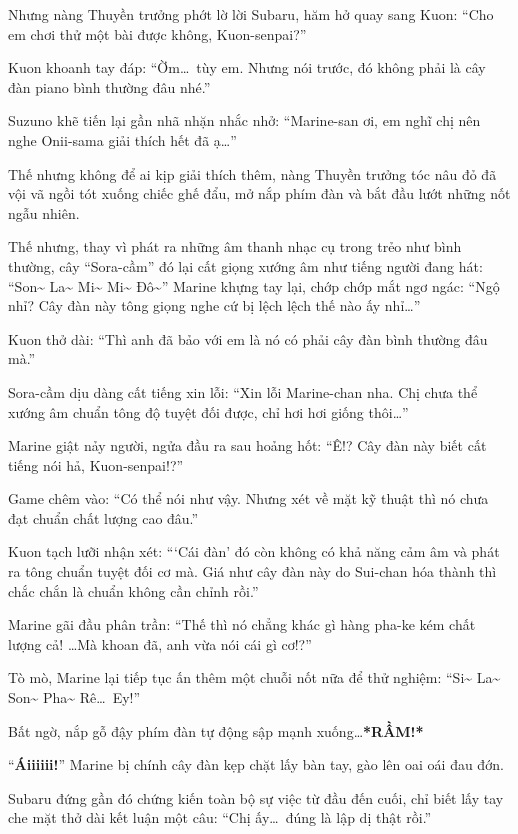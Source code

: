 \documentclass[../main.tex]{subfiles}
\begin{document}
Nhưng nàng Thuyền trưởng phớt lờ lời Subaru, hăm hở quay sang Kuon: ``Cho em chơi thử một bài được không, Kuon-senpai?''

Kuon khoanh tay đáp: ``Ờm\dots\ tùy em. Nhưng nói trước, đó không phải là cây đàn piano bình thường đâu nhé.''

Suzuno khẽ tiến lại gần nhã nhặn nhắc nhở: ``Marine-san ơi, em nghĩ chị nên nghe Onii-sama giải thích hết đã ạ\dots''

Thế nhưng không để ai kịp giải thích thêm, nàng Thuyền trưởng tóc nâu đỏ đã vội vã ngồi tót xuống chiếc ghế đẩu, mở nắp phím đàn và bắt đầu lướt những nốt ngẫu nhiên.


Thế nhưng, thay vì phát ra những âm thanh nhạc cụ trong trẻo như bình thường, cây ``Sora-cầm'' đó lại cất giọng xướng âm như tiếng người đang hát: ``Son\~{} La\~{} Mi\~{} Mi\~{} Đô\~{}'' Marine khựng tay lại, chớp chớp mắt ngơ ngác: ``Ngộ nhỉ? Cây đàn này tông giọng nghe cứ bị lệch lệch thế nào ấy nhỉ\dots''

Kuon thở dài: ``Thì anh đã bảo với em là nó có phải cây đàn bình thường đâu mà.''

Sora-cầm dịu dàng cất tiếng xin lỗi: ``Xin lỗi Marine-chan nha. Chị chưa thể xướng âm chuẩn tông độ tuyệt đối được, chỉ hơi hơi giống thôi\dots''

Marine giật nảy người, ngửa đầu ra sau hoảng hốt: ``Ê!? Cây đàn này biết cất tiếng nói hả, Kuon-senpai!?''

Game chêm vào: ``Có thể nói như vậy. Nhưng xét về mặt kỹ thuật thì nó chưa đạt chuẩn chất lượng cao đâu.''

Kuon tạch lưỡi nhận xét: ```Cái đàn' đó còn không có khả năng cảm âm và phát ra tông chuẩn tuyệt đối cơ mà. Giá như cây đàn này do Sui-chan hóa thành thì chắc chắn là chuẩn không cần chỉnh rồi.''

Marine gãi đầu phân trần: ``Thế thì nó chẳng khác gì hàng pha-ke kém chất lượng cả! \dots Mà khoan đã, anh vừa nói cái gì cơ!?''

Tò mò, Marine lại tiếp tục ấn thêm một chuỗi nốt nữa để thử nghiệm: ``Si\~{} La\~{} Son\~{} Pha\~{} Rê\dots\ Ey!''

Bất ngờ, nắp gỗ đậy phím đàn tự động sập mạnh xuống\dots \textbf{*RẦM!*}

``\textbf{Áiiiiii!}'' Marine bị chính cây đàn kẹp chặt lấy bàn tay, gào lên oai oái đau đớn.

Subaru đứng gần đó chứng kiến toàn bộ sự việc từ đầu đến cuối, chỉ biết lấy tay che mặt thở dài kết luận một câu: ``Chị ấy\dots\ đúng là lập dị thật rồi.''
\end{document}
